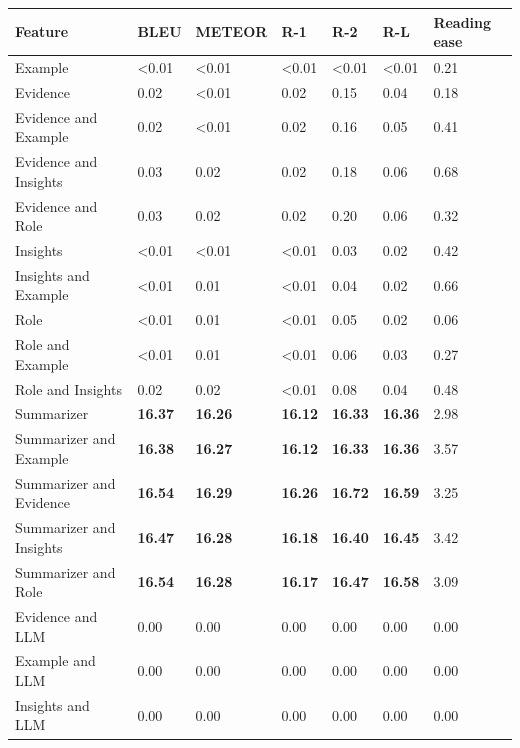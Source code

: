 \begin{tabular}{|l|l|l|l|l|l|l|}
\hline
\textbf{Feature} & BLEU & METEOR & R-1 & R-2 & R-L & Reading ease \\
 \hline
 Example & \textless{}0.01 & \textless{}0.01 & \textless{}0.01 & \textless{}0.01 & \textless{}0.01 & 0.21 \\
 \hline
 Evidence & 0.02 & \textless{}0.01 & 0.02 & 0.15 & 0.04 & 0.18 \\
 \hline
 Evidence and Example & 0.02 & \textless{}0.01 & 0.02 & 0.16 & 0.05 & 0.41 \\
 \hline
 Evidence and Insights & 0.03 & 0.02 & 0.02 & 0.18 & 0.06 & 0.68 \\
 \hline
 Evidence and Role & 0.03 & 0.02 & 0.02 & 0.20 & 0.06 & 0.32 \\
 \hline
 Insights & \textless{}0.01 & \textless{}0.01 & \textless{}0.01 & 0.03 & 0.02 & 0.42 \\
 \hline
 Insights and Example & \textless{}0.01 & 0.01 & \textless{}0.01 & 0.04 & 0.02 & 0.66 \\
 \hline
 Role & \textless{}0.01 & 0.01 & \textless{}0.01 & 0.05 & 0.02 & 0.06 \\
 \hline
 Role and Example & \textless{}0.01 & 0.01 & \textless{}0.01 & 0.06 & 0.03 & 0.27 \\
 \hline
 Role and Insights & 0.02 & 0.02 & \textless{}0.01 & 0.08 & 0.04 & 0.48 \\
 \hline
 Summarizer & \textbf{16.37} & \textbf{16.26} & \textbf{16.12} & \textbf{16.33} & \textbf{16.36} & 2.98 \\
 \hline
 Summarizer and Example & \textbf{16.38} & \textbf{16.27} & \textbf{16.12} & \textbf{16.33} & \textbf{16.36} & 3.57 \\
 \hline
 Summarizer and Evidence & \textbf{16.54} & \textbf{16.29} & \textbf{16.26} & \textbf{16.72} & \textbf{16.59} & 3.25 \\
 \hline
 Summarizer and Insights & \textbf{16.47} & \textbf{16.28} & \textbf{16.18} & \textbf{16.40} & \textbf{16.45} & 3.42 \\
 \hline
 Summarizer and Role & \textbf{16.54} & \textbf{16.28} & \textbf{16.17} & \textbf{16.47} & \textbf{16.58} & 3.09 \\
 \hline
 Evidence and LLM & 0.00 & 0.00 & 0.00 & 0.00 & 0.00 & 0.00 \\
 \hline
 Example and LLM & 0.00 & 0.00 & 0.00 & 0.00 & 0.00 & 0.00 \\
 \hline
 Insights and LLM & 0.00 & 0.00 & 0.00 & 0.00 & 0.00 & 0.00 \\

\end{tabular}
